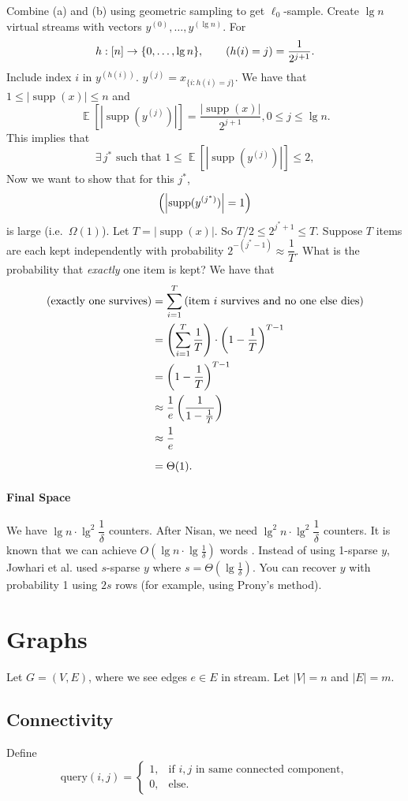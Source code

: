 \documentclass[11pt]{article}
\DeclareMathOperator*{\E}{\mathbb{E}}
\let\Pr\relax
\DeclareMathOperator*{\Pr}{\mathbb{P}}
\DeclareMathOperator{\supp}{supp}
\newcommand{\dl}{\delta}
\newcommand{\abs}[1]{\left\lvert#1\right\rvert}
\theoremstyle{definition}
\theoremstyle{remark}
\begin{document}
Combine (a) and (b) using geometric sampling to get $\ell_0$-sample. Create $\lg n$ virtual streams with vectors $y^{(0)},\ldots,y^{(\lg n)}$. For
\[
h:[n]\to\{0,\ldots,\lg n\},\qquad\Pr(h(i)=j)=\frac{1}{2^{j+1}}.
\]
Include index $i$ in $y^{(h(i))}$. $y^{(j)}=x_{\{i:h(i)=j\}}$. We have that $1\leq|\supp(x)|\leq n$ and
\[
\E\left[\abs{\supp(y^{(j)})}\right]=\frac{\abs{\supp(x)}}{2^{j+1}}, 0\leq j\leq \lg n.
\]
This implies that
\[
\exists\,j^* \text{ such that }1\leq\E\left[\abs{\supp(y^{(j)})}\right]\leq 2,
\]
Now we want to show that for this $j^*$,
\[
\Pr\left(\abs{\supp(y^{(j^*)})}=1\right)
\]
is large (i.e.\ $\Omega(1)$). Let $T=\abs{\supp(x)}$. So $T/2\le 2^{j^*+1}\le T$. Suppose $T$ items are each kept independently with probability $2^{-(j^*-1)} \approx \dfrac{1}{T}$. What is the probability that {\em exactly} one item is kept? We have that
\begin{align*}
\Pr(\text{exactly one survives})&=\sum_{i=1}^T\Pr\left(\text{item $i$ survives and no one else dies}\right) \\
&=\left(\sum_{i=1}^T\frac{1}{T}\right)\cdot\left(1-\frac{1}{T}\right)^{T-1} \\
&=\left(1-\frac{1}{T}\right)^{T-1} \\
&\approx\frac{1}{e}\left(\frac{1}{1-\frac{1}{T}}\right) \\
&\approx\frac{1}{e} \\[6pt]
&=\Theta(1).
\end{align*}
\paragraph{Final Space}
We have $\lg n\cdot\lg^2\dfrac{1}{\dl}$ counters. After Nisan, we need $\lg^2 n\cdot\lg^2\dfrac{1}{\dl}$ counters. It is known that we can achieve $O(\lg n\cdot\lg\frac{1}{\dl})$ words \cite{JST11}. Instead of using 1-sparse $y$, Jowhari et al. used $s$-sparse $y$ where $s=\Theta(\lg\frac{1}{\dl})$. You can recover $y$ with probability 1 using $2s$ rows (for example, using Prony's method).


\section{Graphs}
Let $G=(V,E)$, where we see edges $e\in E$ in stream. Let $|V|=n$ and $|E|=m$.
\subsection{Connectivity}
Define
\[
\text{query}(i,j)=
\begin{cases}
1, & \text{if $i,j$ in same connected component}, \\
0, & \text{else}.
\end{cases}
\]
\end{document}

